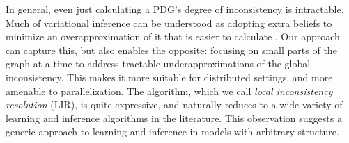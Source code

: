 In general, even just calculating a PDG's degree of inconsistency is intractable.
Much of variational inference can be understood as
    adopting extra beliefs to
    minimize an over\-approximation of it that is easier to calculate \citep{one-true-loss}.
Our approach can capture this, but also enables the opposite:
    focusing on small parts of the graph at a time to
    address tractable under\-approximations of the global inconsistency.
This makes it more suitable for distributed settings,
    and more amenable to parallelization.
%
The algorithm, which we call \emph{local inconsistency resolution} (LIR),
    is quite expressive,
    and naturally reduces to a wide variety of learning and inference algorithms in the literature.
This observation suggests a generic approach to learning and
    inference in models with arbitrary structure.
%



